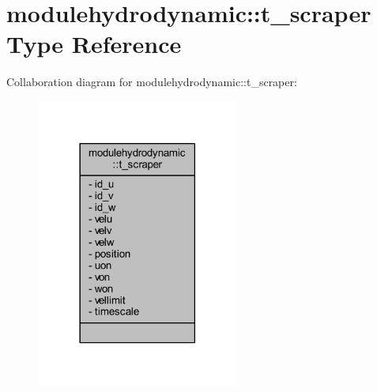 \hypertarget{structmodulehydrodynamic_1_1t__scraper}{}\section{modulehydrodynamic\+:\+:t\+\_\+scraper Type Reference}
\label{structmodulehydrodynamic_1_1t__scraper}


Collaboration diagram for modulehydrodynamic\+:\+:t\+\_\+scraper\+:\nopagebreak
\begin{figure}[H]
\begin{center}
\leavevmode
\includegraphics[width=189pt]{structmodulehydrodynamic_1_1t__scraper__coll__graph}
\end{center}
\end{figure}
